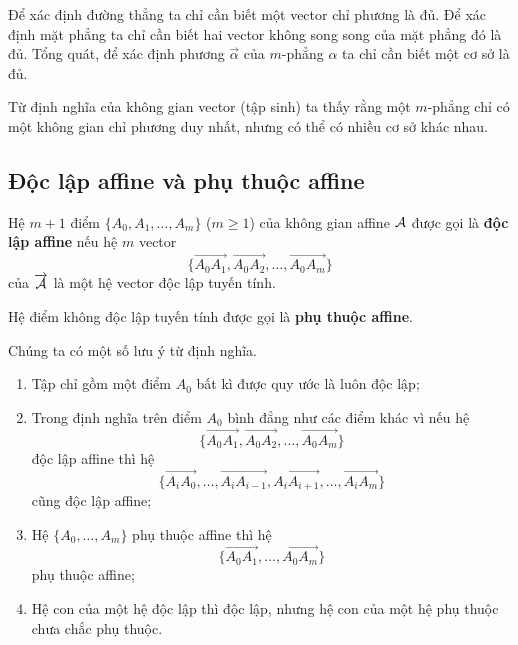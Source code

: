 Để xác định đường thẳng ta chỉ cần biết một vector chỉ phương là đủ. Để xác định mặt phẳng ta chỉ cần biết hai vector không song song của mặt phẳng đó là đủ. Tổng quát, để xác định phương $\overrightarrow{\alpha}$ của $m$-phẳng $\alpha$ ta chỉ cần biết một cơ sở là đủ.

Từ định nghĩa của không gian vector (tập sinh) ta thấy rằng một $m$-phẳng chỉ có một không gian chỉ phương duy nhất, nhưng có thể có nhiều cơ sở khác nhau.

\subsection*{Độc lập affine và phụ thuộc affine}

\begin{definition}
	Hệ $m+1$ điểm $\{A_0, A_1, \ldots, A_m\}$ ($m \geq 1$) của không gian affine $\mathcal{A}$ được gọi là \textbf{độc lập affine} nếu hệ $m$ vector 
    \begin{equation*}
        \{\overrightarrow{A_0 A_1}, \overrightarrow{A_0 A_2}, \ldots, \overrightarrow{A_0 A_m}\}
    \end{equation*}
    của $\overrightarrow{\mathcal{A}}$ là một hệ vector độc lập tuyến tính.
	
	Hệ điểm không độc lập tuyến tính được gọi là \textbf{phụ thuộc affine}.
\end{definition}

Chúng ta có một số lưu ý từ định nghĩa.

\begin{enumerate}
	\item Tập chỉ gồm một điểm $A_0$ bất kì được quy ước là luôn độc lập;
	\item Trong định nghĩa trên điểm $A_0$ bình đẳng như các điểm khác vì nếu hệ
    \begin{equation*}
        \{\overrightarrow{A_0 A_1}, \overrightarrow{A_0 A_2}, \ldots, \overrightarrow{A_0 A_m}\}
    \end{equation*}
    độc lập affine thì hệ
    \begin{equation*}
        \{\overrightarrow{A_i A_0}, \ldots, \overrightarrow{A_i A_{i-1}}, \overrightarrow{A_i A_{i+1}}, \ldots, \overrightarrow{A_i A_m}\}
    \end{equation*}
    cũng độc lập affine;
	\item Hệ $\{A_0, \ldots, A_m\}$ phụ thuộc affine thì hệ
    \begin{equation*}
        \{\overrightarrow{A_0 A_1}, \ldots, \overrightarrow{A_0 A_m}\}
    \end{equation*}
    phụ thuộc affine;
	\item Hệ con của một hệ độc lập thì độc lập, nhưng hệ con của một hệ phụ thuộc chưa chắc phụ thuộc.
\end{enumerate}

